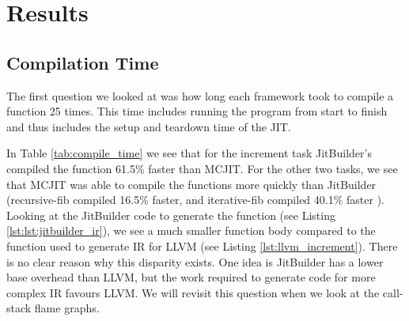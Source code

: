 \section{Results}
\label{sec:results}
\subsection{Compilation Time}
The first question we looked at was how long each framework took to compile a function 25 times. This time includes running the program from start to finish and thus includes the setup and teardown time of the JIT.

In Table \ref{tab:compile_time} we see that for the increment task JitBuilder's compiled the function 61.5\% faster than MCJIT.
For the other two tasks, we see that MCJIT was able to compile the functions more quickly than JitBuilder (recursive-fib compiled 16.5\% faster, and iterative-fib compiled 40.1\% faster ).
Looking at the JitBuilder code to generate the function (see Listing \ref{lst:lst:jitbuilder_ir}), we see a much smaller function body compared to the function used to generate IR for LLVM (see Listing \ref{lst:llvm_increment}).
There is no clear reason why this disparity exists.
One idea is JitBuilder has a lower base overhead than LLVM, but the work required to generate code for more complex IR favours LLVM.
We will revisit this question when we look at the call-stack flame graphs.


